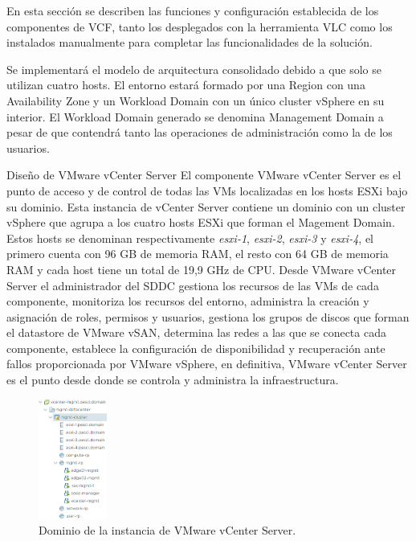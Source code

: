 En esta sección se describen las funciones y configuración establecida de los componentes de VCF, tanto los desplegados con la herramienta VLC como los instalados manualmente para completar las funcionalidades de la solución.

Se implementará el modelo de arquitectura consolidado debido a que solo se utilizan cuatro hosts. El entorno estará formado por una Region con una Availability Zone y un Workload Domain con un único cluster vSphere en su interior. El Workload Domain generado se denomina Management Domain a pesar de que contendrá tanto las operaciones de administración como la de los usuarios.

\begin{subsubsection}{Diseño de VMware vCenter Server}
  \label{subsubsec:diseno-vcenter}
El componente VMware vCenter Server es el punto de acceso y de control de todas las VMs localizadas en los hosts ESXi bajo su dominio. Esta instancia de vCenter Server contiene un dominio con un cluster vSphere que agrupa a los cuatro hosts ESXi que forman el Magement Domain. Estos hosts se denominan respectivamente \textit{esxi-1}, \textit{esxi-2}, \textit{esxi-3} y \textit{esxi-4}, el primero cuenta con 96 GB de memoria RAM, el resto con 64 GB de memoria RAM y cada host tiene un total de 19,9 GHz de CPU. Desde VMware vCenter Server el administrador del SDDC gestiona los recursos de las VMs de cada componente, monitoriza los recursos del entorno, administra la creación y asignación de roles, permisos y usuarios, gestiona los grupos de discos que forman el datastore de VMware vSAN, determina las redes a las que se conecta cada componente, establece la configuración de disponibilidad y recuperación ante fallos proporcionada por VMware vSphere, en definitiva, VMware vCenter Server es el punto desde donde se controla y administra la infraestructura.
\begin{figure}[h]
  \centering
  \includegraphics[width=0.2\textwidth]{imaxes/pruebaconcepto/clusterVCenterServer.png}
  \caption{Dominio de la instancia de VMware vCenter Server.}
  \label{fig:cluster-vCenter-Server}

\end{figure}
\end{subsubsection}
